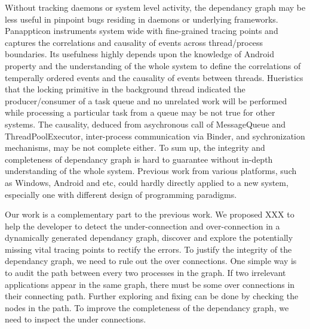 Without tracking daemons or system level activity, the dependancy graph may be less useful in pinpoint bugs residing in daemons or underlying frameworks.
Panappticon instruments system wide with fine-grained tracing points and captures the correlations and causality of events across thread/process boundaries.
Its usefulness highly depends upon the knowledge of Android property and the understanding of the whole system to define the correlations of temperally ordered events and the causality of events between threads.
Hueristics that the locking primitive in the background thread indicated the producer/consumer of a task queue and no unrelated work will be performed while processing a particular task from a queue may be not true for other systems.
The causality, deduced from asychronous call of MessageQueue and ThreadPoolExecutor, inter-process communication via Binder, and sychronization mechanisms, may be not complete either.
To sum up, the integrity and completeness of dependancy graph is hard to guarantee without in-depth understanding of the whole system.
Previous work from various platforms, such as Windows, Android and etc, could hardly directly applied to a new system, especially one with different design of programming paradigms.
\par
Our work is a complementary part to the previous work.
We proposed XXX to help the developer to detect the under-connection and over-connection in a dynamically generated dependancy graph, discover and explore the potentially missing vital tracing points to rectify the errors. 
To justify the integrity of the dependancy graph, we need to rule out the over connections.
One simple way is to audit the path between every two processes in the graph.
If two irrelevant applications appear in the same graph, there must be some over connections in their connecting path.
Further exploring and fixing can be done by checking the nodes in the path.
To improve the completeness of the dependancy graph, we need to inspect the under connections.
%
%

